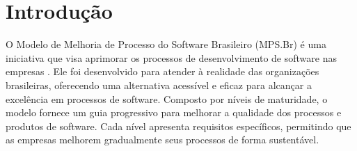 \documentclass[
	12pt,				%
	oneside,			%
	a4paper,			%
	english,			%
	brazil				%
	]{abntex2unama}
\begin{document}
\frenchspacing


%
% 
%
\imprimircapa

\tableofcontents*
\cleardoublepage



\textual



% 
%
%
\chapter{Introdução}
O Modelo de Melhoria de Processo do Software Brasileiro (MPS.Br) é uma iniciativa que visa aprimorar os processos de desenvolvimento de software nas empresas \cite{mpsbr}. Ele foi desenvolvido para atender à realidade das organizações brasileiras, oferecendo uma alternativa acessível e eficaz para alcançar a excelência em processos de software. Composto por níveis de maturidade, o modelo fornece um guia progressivo para melhorar a qualidade dos processos e produtos de software. Cada nível apresenta requisitos específicos, permitindo que as empresas melhorem gradualmente seus processos de forma sustentável.
\end{document}

